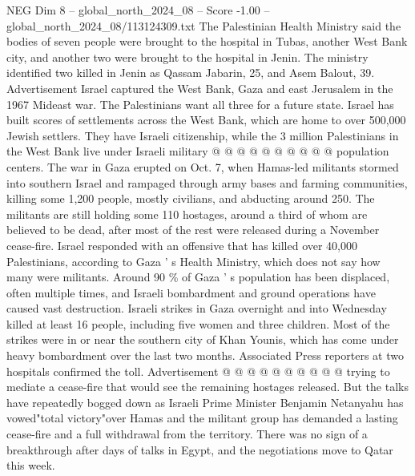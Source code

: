 \begin{textsample}{NEG Dim 8 – global\_north\_2024\_08 – Score -1.00 – global\_north\_2024\_08/113124309.txt}
The Palestinian Health Ministry said the bodies of seven people were brought to the hospital in Tubas, another West Bank city, and another two were brought to the hospital in Jenin.
The ministry identified two killed in Jenin as Qassam Jabarin, 25, and Asem Balout, 39.
Advertisement Israel captured the West Bank, Gaza and east Jerusalem in the 1967 Mideast war.
The Palestinians want all three for a future state.
Israel has built scores of settlements across the West Bank, which are home to over 500,000 Jewish settlers.
They have Israeli citizenship, while the 3 million Palestinians in the West Bank live under Israeli military @ @ @ @ @ @ @ @ @ @ population centers.
The war in Gaza erupted on Oct. 7, when Hamas-led militants stormed into southern Israel and rampaged through army bases and farming communities, killing some 1,200 people, mostly civilians, and abducting around 250.
The militants are still holding some 110 hostages, around a third of whom are believed to be dead, after most of the rest were released during a November cease-fire.
Israel responded with an offensive that has killed over 40,000 Palestinians, according to Gaza ' s Health Ministry, which does not say how many were militants.
Around 90 \% of Gaza ' s population has been displaced, often multiple times, and Israeli bombardment and ground operations have caused vast destruction.
Israeli strikes in Gaza overnight and into Wednesday killed at least 16 people, including five women and three children.
Most of the strikes were in or near the southern city of Khan Younis, which has come under heavy bombardment over the last two months.
Associated Press reporters at two hospitals confirmed the toll.
Advertisement @ @ @ @ @ @ @ @ @ @ trying to mediate a cease-fire that would see the remaining hostages released.
But the talks have repeatedly bogged down as Israeli Prime Minister Benjamin Netanyahu has vowed"total victory"over Hamas and the militant group has demanded a lasting cease-fire and a full withdrawal from the territory.
There was no sign of a breakthrough after days of talks in Egypt, and the negotiations move to Qatar this week.

\end{textsample}
